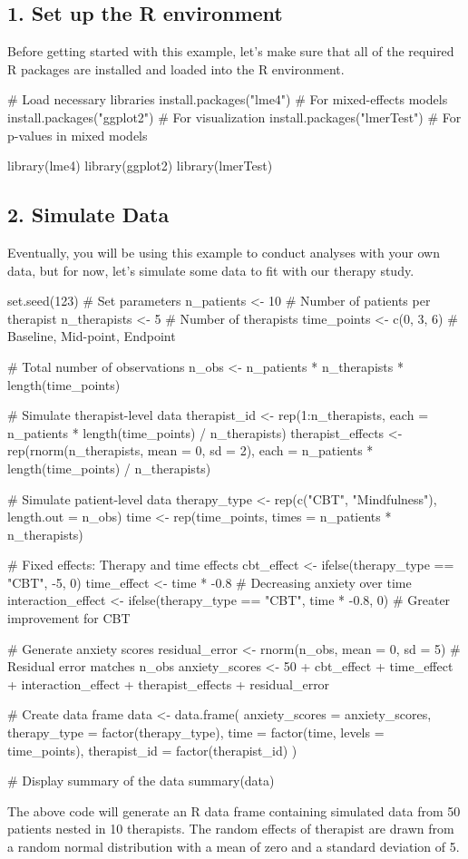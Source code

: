 \subsection*{1. Set up the R environment}
Before getting started with this example, let's make sure that all of the required R packages are installed and loaded into the R environment.
\begin{mycode}[R]
# Load necessary libraries
install.packages("lme4")  # For mixed-effects models
install.packages("ggplot2")  # For visualization
install.packages("lmerTest")  # For p-values in mixed models

library(lme4)
library(ggplot2)
library(lmerTest)
\end{mycode}

\subsection*{2. Simulate Data}
Eventually, you will be using this example to conduct analyses with your own data, but for now, let's simulate some data to fit with our therapy study.
\begin{mycode}[R]
set.seed(123)
# Set parameters
n_patients <- 10          # Number of patients per therapist
n_therapists <- 5         # Number of therapists
time_points <- c(0, 3, 6) # Baseline, Mid-point, Endpoint

# Total number of observations
n_obs <- n_patients * n_therapists * length(time_points)

# Simulate therapist-level data
therapist_id <- rep(1:n_therapists, each = n_patients * 
     length(time_points) / n_therapists)
therapist_effects <- rep(rnorm(n_therapists, mean = 0, sd = 2), 
     each = n_patients * length(time_points) / n_therapists)

# Simulate patient-level data
therapy_type <- rep(c("CBT", "Mindfulness"), length.out = n_obs)
time <- rep(time_points, times = n_patients * n_therapists)

# Fixed effects: Therapy and time effects
cbt_effect <- ifelse(therapy_type == "CBT", -5, 0)
time_effect <- time * -0.8 # Decreasing anxiety over time
interaction_effect <- ifelse(therapy_type == "CBT", time * -0.8, 0) 
     # Greater improvement for CBT

# Generate anxiety scores
residual_error <- rnorm(n_obs, mean = 0, sd = 5) 
     # Residual error matches n_obs
anxiety_scores <- 50 + cbt_effect + time_effect + interaction_effect
      + therapist_effects + residual_error

# Create data frame
data <- data.frame(
  anxiety_scores = anxiety_scores,
  therapy_type = factor(therapy_type),
  time = factor(time, levels = time_points),
  therapist_id = factor(therapist_id)
)

# Display summary of the data
summary(data)
\end{mycode}
The above code will generate an R data frame containing simulated data from 50 patients nested in 10 therapists.  The random effects of therapist are drawn from a random normal distribution with a mean of zero and a standard deviation of 5.

